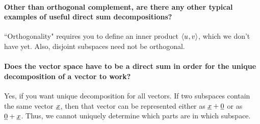 \documentclass[10pt,english]{article}
\begin{document}
\paragraph{Other than orthogonal complement, are there any other typical examples of useful direct sum decompositions?}

``Orthogonality" requires you to define an inner product ${\langle  u  \mskip1mu ,  v  \rangle}$, which we don't have yet.
Also, disjoint subspaces need not be orthogonal.

\paragraph{Does the vector space have to be a direct sum in order for the unique decomposition of a vector to work?}

Yes, if you want unique decomposition for all vectors.
If two subspaces contain the same vector $\underline{x}$, then that vector can be represented either as $\underline{x} + \underline{0}$ or as $\underline{0} + \underline{x}$.
Thus, we cannot uniquely determine which parts are in which subspace.
\end{document}
